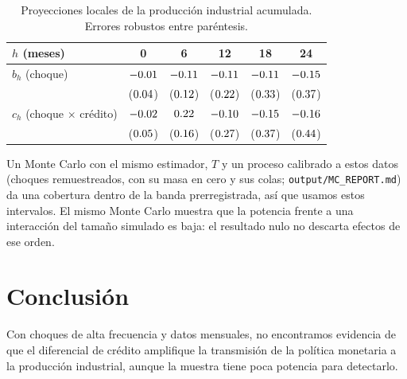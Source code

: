 \documentclass[11pt]{article}
\begin{document}
\begin{table}[h]
\centering
\begin{tabular}{lccccc}
\toprule
$h$ (meses) & 0 & 6 & 12 & 18 & 24 \\
\midrule
$b_h$ (choque) & $-0.01$ & $-0.11$ & $-0.11$ & $-0.11$ & $-0.15$ \\
 & ($0.04$) & ($0.12$) & ($0.22$) & ($0.33$) & ($0.37$) \\
$c_h$ (choque $\times$ crédito) & $-0.02$ & $0.22$ & $-0.10$ & $-0.15$ & $-0.16$ \\
 & ($0.05$) & ($0.16$) & ($0.27$) & ($0.37$) & ($0.44$) \\
\bottomrule
\end{tabular}
\caption{Proyecciones locales de la producción industrial acumulada. Errores robustos entre paréntesis.}
\end{table}

Un Monte Carlo con el mismo estimador, $T$ y un proceso calibrado a estos datos (choques remuestreados, con su masa en
cero y sus colas; \texttt{output/MC\_REPORT.md}) da una cobertura dentro de la banda prerregistrada, así que usamos estos
intervalos. El mismo Monte Carlo muestra que la potencia frente a una interacción del tamaño simulado es baja: el
resultado nulo no descarta efectos de ese orden.

\section{Conclusión}
Con choques de alta frecuencia y datos mensuales, no encontramos evidencia de que el diferencial de crédito amplifique la
transmisión de la política monetaria a la producción industrial, aunque la muestra tiene poca potencia para detectarlo.
\end{document}
